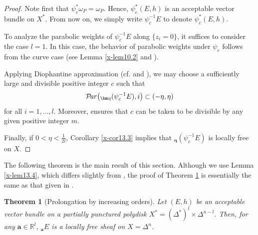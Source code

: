 \documentclass[12pt,twoside]{amsart}
\DeclareMathOperator{\Par}{\mathcal{P}\!\it{ar}}
\newtheorem{thm}{Theorem}[section]
\theoremstyle{definition}
\begin{document}
\begin{proof}
Note first that $\psi_c^*\omega_P = \omega_P$. 
Hence, $\psi_c^*(E, h)$ is an acceptable vector bundle on $X^*$. 
From now on, we simply write $\psi^{-1}_cE$ to denote $\psi^*_c(E, h)$.

To analyze the parabolic weights of $\psi_c^{-1}E$ along $\{z_i=0\}$, 
it suffices to consider the case $l=1$. 
In this case, the behavior of parabolic weights under $\psi_c$ 
follows from the curve case (see Lemma \ref{x-lem10.2} and 
\cite[Section 11]{fujino-fujisawa-ono}). 

Applying Diophantine approximation 
(cf. \cite[Lemma 12.2]{fujino-fujisawa-ono} 
and \cite[Chapter I, Theorem VI]{cas}), 
we may choose a sufficiently large and divisible positive integer $c$ such that
\[
\Par\bigl({}_{\bm \eta} (\psi_c^{-1}E), i\bigr) \subset (-\eta, \eta)
\]
for all $i=1, \dots, l$. 
Moreover, \cite[Lemma 12.2]{fujino-fujisawa-ono} ensures that $c$ can be taken 
to be divisible by any given positive integer $m$. 

Finally, if $0<\eta<\frac{1}{2l}$, Corollary \ref{x-cor13.3} implies 
that ${}_{\bm \eta} (\psi_c^{-1}E)$ is locally free on $X$.
\end{proof}

The following theorem is the main result of this section. 
Although we use Lemma \ref{x-lem13.4}, which differs slightly from 
\cite[Lemma 21.7.2]{mochizuki4}, the proof of Theorem \ref{x-thm13.5} 
is essentially the same as that given 
in \cite[21.7.2.~Proof of Theorem 21.3.1]{mochizuki4}.

\begin{thm}[Prolongation by increasing orders]\label{x-thm13.5}
Let $(E, h)$ be an acceptable vector bundle on 
a partially punctured polydisk 
$X^*=(\Delta^*)^l\times \Delta^{n-l}$. 
Then, for any $\bm a\in \mathbb R^l$, ${}_{\bm a} E$ is 
a locally free sheaf on $X=\Delta^n$.
\end{thm}
\end{document}

